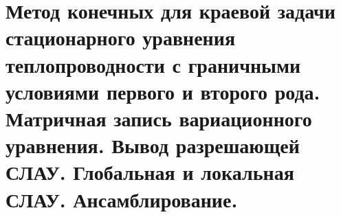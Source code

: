 \documentclass[__main__.tex]{subfiles}
\begin{document}
\section{Метод конечных для краевой задачи стационарного уравнения теплопроводности с граничными условиями первого и второго рода. Матричная запись вариационного уравнения. Вывод разрешающей СЛАУ. Глобальная и локальная СЛАУ. Ансамблирование.}
\end{document}
